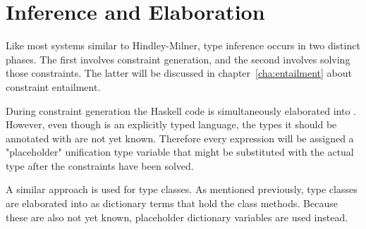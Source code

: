\chapter{Inference and Elaboration}
\label{cha:inference}
Like most systems similar to Hindley-Milner, type inference occurs in two
distinct phases. The first involves constraint generation, and the second
involves solving those constraints. The latter will be discussed in
chapter~\ref{cha:entailment} about constraint entailment.

During constraint generation the Haskell code is simultaneously elaborated into
\systemfc. However, even though \systemfc is an explicitly typed language,
the types it should be annotated with are not yet known. Therefore every
expression will be assigned a "placeholder" unification type variable that might
be substituted with the actual type after the constraints have been solved.

A similar approach is used for type classes. As mentioned previously, type
classes are elaborated into \systemfc as dictionary terms that hold the class
methods. Because these are also not yet known, placeholder dictionary variables
are used instead.


